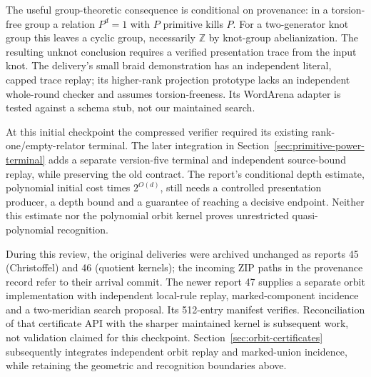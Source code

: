 The useful group-theoretic consequence is conditional on provenance:
in a torsion-free group a relation $P^d=1$ with $P$ primitive kills $P$.
For a two-generator knot group this leaves a cyclic group, necessarily
$\mathbb Z$ by knot-group abelianization. The resulting unknot conclusion
requires a verified presentation trace from the input knot. The delivery's
small braid demonstration has an independent literal, capped trace replay;
its higher-rank projection prototype lacks an independent whole-round
checker and assumes torsion-freeness. Its WordArena adapter is tested
against a schema stub, not our maintained search.

At this initial checkpoint the compressed verifier required its existing
rank-one/empty-relator terminal. The later integration in
Section~\ref{sec:primitive-power-terminal} adds a separate version-five
terminal and independent source-bound replay, while preserving the old
contract. The report's
conditional depth estimate, polynomial initial cost times $2^{O(d)}$,
still needs a controlled presentation producer, a depth bound and a
guarantee of reaching a decisive endpoint. Neither this estimate nor the
polynomial orbit kernel proves unrestricted quasi-polynomial recognition.

During this review, the original deliveries were archived unchanged as
reports 45 (Christoffel) and 46 (quotient kernels); the incoming ZIP paths
in the provenance record refer to their arrival commit. The newer report
47 supplies a separate orbit implementation with independent local-rule
replay, marked-component incidence and a two-meridian search proposal.
Its 512-entry manifest verifies. Reconciliation of that certificate API
with the sharper maintained kernel is subsequent work, not validation
claimed for this checkpoint.
Section~\ref{sec:orbit-certificates} subsequently integrates independent
orbit replay and marked-union incidence, while retaining the geometric
and recognition boundaries above.
